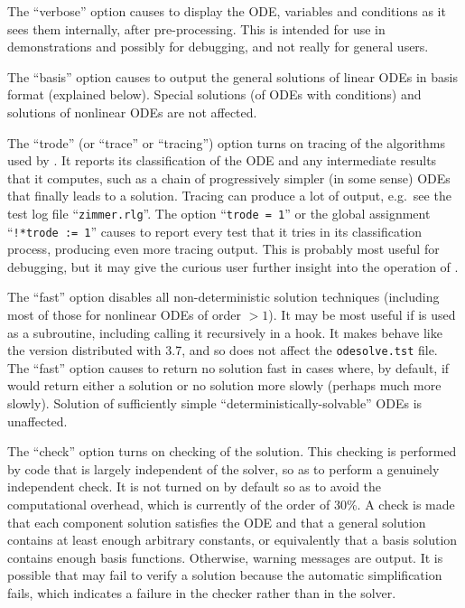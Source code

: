 The ``verbose'' option causes  to display the ODE, variables
and conditions as it sees them internally, after pre-processing.  This
is intended for use in demonstrations and possibly for debugging, and
not really for general users.

The ``basis'' option causes  to output the general solutions
of linear ODEs in basis format (explained below).  Special solutions
(of ODEs with conditions) and solutions of nonlinear ODEs are not
affected.

The ``trode'' (or ``trace'' or ``tracing'') option turns on tracing of
the algorithms used by .  It reports its classification of
the ODE and any intermediate results that it computes, such as a chain
of progressively simpler (in some sense) ODEs that finally leads to a
solution.  Tracing can produce a lot of output, e.g.\ see the test log
file ``\texttt{zimmer.rlg}''.  The option ``\texttt{trode = 1}'' or
the global assignment ``\texttt{!*trode := 1}'' causes  to
report every test that it tries in its classification process,
producing even more tracing output.  This is probably most useful for
debugging, but it may give the curious user further insight into the
operation of .

The ``fast'' option disables all non-deterministic solution techniques
(including most of those for nonlinear ODEs of order $> 1$).  It may
be most useful if  is used as a subroutine, including calling
it recursively in a hook.  It makes  behave like the version
distributed with \REDUCE{} 3.7, and so does not affect the
\texttt{odesolve.tst} file.  The ``fast'' option causes  to
return no solution fast in cases where, by default, if would return
either a solution or no solution more slowly (perhaps much more
slowly).  Solution of sufficiently simple
``deterministically-solvable'' ODEs is unaffected.

The ``check'' option turns on checking of the solution.  This checking
is performed by code that is largely independent of the solver, so as
to perform a genuinely independent check.  It is not turned on by
default so as to avoid the computational overhead, which is currently
of the order of 30\%.  A check is made that each component solution
satisfies the ODE and that a general solution contains at least enough
arbitrary constants, or equivalently that a basis solution contains
enough basis functions.  Otherwise, warning messages are output.  It
is possible that  may fail to verify a solution because the
automatic simplification fails, which indicates a failure in the
checker rather than in the solver.

